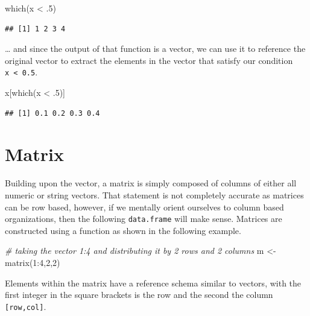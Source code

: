 \documentclass[
]{book}
\newenvironment{Shaded}{\begin{snugshade}}{\end{snugshade}}
\newcommand{\CommentTok}[1]{\textcolor[rgb]{0.56,0.35,0.01}{\textit{#1}}}
\newcommand{\DecValTok}[1]{\textcolor[rgb]{0.00,0.00,0.81}{#1}}
\newcommand{\FunctionTok}[1]{\textcolor[rgb]{0.00,0.00,0.00}{#1}}
\newcommand{\NormalTok}[1]{#1}
\newcommand{\OtherTok}[1]{\textcolor[rgb]{0.56,0.35,0.01}{#1}}
\newcommand{\SpecialCharTok}[1]{\textcolor[rgb]{0.00,0.00,0.00}{#1}}
\begin{document}
\begin{Shaded}
\begin{Highlighting}[]
\FunctionTok{which}\NormalTok{(x }\SpecialCharTok{\textless{}}\NormalTok{ .}\DecValTok{5}\NormalTok{)}
\end{Highlighting}
\end{Shaded}

\begin{verbatim}
## [1] 1 2 3 4
\end{verbatim}

\ldots{} and since the output of that function is a vector, we can use it to reference the original vector to extract the elements in the vector that satisfy our condition \texttt{x\ \textless{}\ 0.5}.

\begin{Shaded}
\begin{Highlighting}[]
\NormalTok{x[}\FunctionTok{which}\NormalTok{(x }\SpecialCharTok{\textless{}}\NormalTok{ .}\DecValTok{5}\NormalTok{)]}
\end{Highlighting}
\end{Shaded}

\begin{verbatim}
## [1] 0.1 0.2 0.3 0.4
\end{verbatim}

\hypertarget{matrix}{%
\section{Matrix}\label{matrix}}

Building upon the vector, a matrix is simply composed of columns of either all numeric or string vectors. That statement is not completely accurate as matrices can be row based, however, if we mentally orient ourselves to column based organizations, then the following \texttt{data.frame} will make sense. Matrices are constructed using a function as shown in the following example.

\begin{Shaded}
\begin{Highlighting}[]
\CommentTok{\# taking the vector 1:4 and distributing it by 2 rows and 2 columns}
\NormalTok{m }\OtherTok{\textless{}{-}} \FunctionTok{matrix}\NormalTok{(}\DecValTok{1}\SpecialCharTok{:}\DecValTok{4}\NormalTok{,}\DecValTok{2}\NormalTok{,}\DecValTok{2}\NormalTok{)}
\end{Highlighting}
\end{Shaded}

Elements within the matrix have a reference schema similar to vectors, with the first integer in the square brackets is the row and the second the column \texttt{{[}row,col{]}}.
\end{document}
